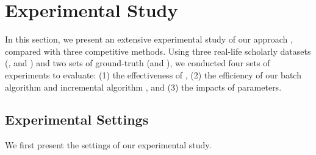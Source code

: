 \section{Experimental Study}
\label{sec-exp}

In this section, we present an extensive experimental study of our approach \ensemblerank, compared with three competitive methods.
Using three real-life scholarly datasets (\aan, \aminer and \magdata) and two sets of ground-truth (\recom and \fcita), we conducted four sets of experiments to evaluate: (1) the effectiveness of \ensemblerank,
(2) the efficiency of our batch algorithm \batensemble and incremental algorithm \incensemble, and (3) the impacts of parameters. %

\subsection{Experimental Settings}

We first present the settings of our experimental study.


